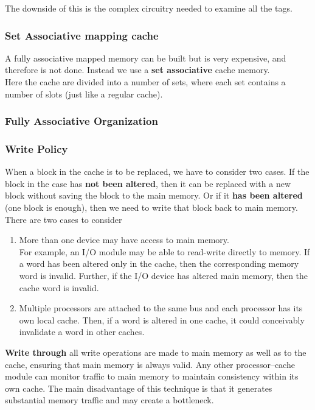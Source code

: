 The downside of this is the complex circuitry needed to examine all the tags.

\subsubsection{Set Associative mapping cache}
A fully associative mapped memory can be built but is very expensive, and therefore is not done. Instead we use a \textbf{set associative} cache memory. \\
Here the cache are divided into a number of sets, where each set contains a number of slots (just like a regular cache). 


\subsubsection{Fully Associative Organization}


\subsubsection{Write Policy}
When a block in the cache is to be replaced, we have to consider two cases. If the block in the case has \textbf{not been altered}, then it can be replaced with a new block without saving the block to the main memory. Or if it \textbf{has been altered} (one block is enough), then we need to write that block back to main memory. \\

There are two cases to consider
\begin{enumerate}
\item More than one device may have access to main memory. \\
  
  For example, an I/O module may be able to read-write directly to memory. If a word has been altered only in the cache, then the corresponding memory word is invalid. Further, if the I/O device has altered main memory, then the cache word is invalid. \\
\item Multiple processors are attached to the same bus and each processor has its own local cache. Then, if a word is altered in one cache, it could conceivably invalidate a word in other caches.
\end{enumerate}
\textbf{Write through} all write operations are made to main memory as well as to the cache, ensuring that main memory is always valid. Any other processor–cache module can monitor traffic to main memory to maintain consistency within its own cache. The main disadvantage of this technique is that it generates substantial memory traffic and may create a bottleneck.\\


